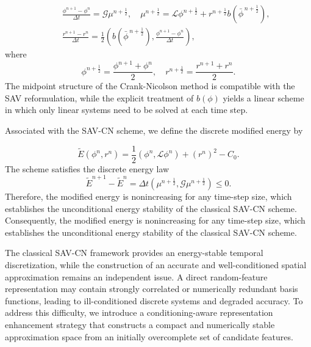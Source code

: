 \documentclass[10pt,reqno]{amsart}
\theoremstyle{remark}
\theoremstyle{definition}
\begin{document}
\begin{equation}
\begin{aligned}
& \frac{\phi^{n+1}-\phi^n}{\Delta t} =\mathcal{G}\mu^{n+\frac12}, \quad \mu^{n+\frac12}=\mathcal{L}\phi^{n+\frac12} + r^{n+\frac12} b\left(\bar{\phi}^{\,n+\frac12}\right), \\
\quad
& \frac{r^{n+1}-r^n}{\Delta t} = \frac12
\left(b \left(\bar{\phi}^{\,n+\frac12}\right),
\frac{\phi^{n+1}-\phi^n}{\Delta t}
\right),
\end{aligned}
\end{equation}
where
\begin{equation}
\phi^{n+\frac12} = \frac{\phi^{n+1}+\phi^n}{2}, \quad
r^{n+\frac12} = \frac{r^{n+1}+r^n}{2}.
\end{equation}
The midpoint structure of the Crank-Nicolson method is compatible with the SAV reformulation, while the explicit treatment of $b(\phi)$ yields a linear scheme in which only linear systems need to be solved at each time step.

Associated with the SAV-CN scheme, we define the discrete modified energy by

\begin{equation}
  \widetilde{E}(\phi^n,r^n) = \frac12(\phi^n,\mathcal{L}\phi^n) + (r^n)^2 - C_0.
\end{equation}
The scheme satisfies the discrete energy law
\begin{equation}
  \widetilde{E}^{n+1} - \widetilde{E}^n = \Delta t (\mu^{n+\frac12}, \mathcal{G}\mu^{n+\frac12}) \le 0.
\end{equation}
Therefore, the modified energy is nonincreasing for any time-step size, which establishes the unconditional energy stability of the classical SAV-CN scheme. Consequently, the modified energy is nonincreasing for any time-step size, which establishes the unconditional energy stability of the classical SAV-CN scheme.

The classical SAV-CN framework provides an energy-stable temporal discretization, while the construction of an accurate and well-conditioned spatial approximation remains an independent issue. A direct random-feature representation may contain strongly correlated or numerically redundant basis functions, leading to ill-conditioned discrete systems and degraded accuracy. To address this difficulty, we introduce a conditioning-aware representation enhancement strategy that constructs a compact and numerically stable approximation space from an initially overcomplete set of candidate features.
\end{document}
